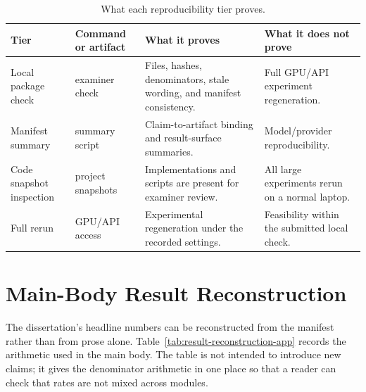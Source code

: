 \begin{table}[htbp]
\centering
\caption{What each reproducibility tier proves.}
\label{tab:reproducibility-tiers}
\tighttable
\begin{tabularx}{\textwidth}{@{}L{1.75cm}L{2.15cm}YY@{}}
\toprule
Tier & Command or artifact & What it proves & What it does not prove \\
\midrule
Local package check & examiner check & Files, hashes, denominators, stale wording, and manifest consistency. & Full GPU/API experiment regeneration. \\
Manifest summary & summary script & Claim-to-artifact binding and result-surface summaries. & Model/provider reproducibility. \\
Code snapshot inspection & project snapshots & Implementations and scripts are present for examiner review. & All large experiments rerun on a normal laptop. \\
Full rerun & GPU/API access & Experimental regeneration under the recorded settings. & Feasibility within the submitted local check. \\
\bottomrule
\end{tabularx}
\end{table}

\section{Main-Body Result Reconstruction}

The dissertation's headline numbers can be reconstructed from the manifest rather than from prose alone. Table~\ref{tab:result-reconstruction-app} records the arithmetic used in the main body. The table is not intended to introduce new claims; it gives the denominator arithmetic in one place so that a reader can check that rates are not mixed across modules.

